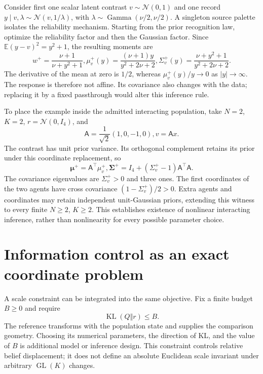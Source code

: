 \documentclass[11pt]{article}
\newcommand{\KL}{\operatorname{KL}}
\newcommand{\E}{\mathbb E}
\newcommand{\GL}{\operatorname{GL}}
\newcommand{\Ga}{\operatorname{Gamma}}
\newcommand{\m}{\boldsymbol{\mu}}
\newcommand{\Sig}{\boldsymbol{\Sigma}}
\begin{document}
Consider first one scalar latent contrast $v\sim\mathcal N(0,1)$ and one record $y\mid v,\lambda\sim\mathcal N(v,1/\lambda)$, with $\lambda\sim\Ga(\nu/2,\nu/2)$. A singleton source palette isolates the reliability mechanism. Starting from the prior recognition law, optimize the reliability factor and then the Gaussian factor. Since $\E(y-v)^2=y^2+1$, the resulting moments are
\begin{equation}
 w^+=\frac{\nu+1}{\nu+y^2+1},
 \mu_v^+(y)=\frac{(\nu+1)y}{y^2+2\nu+2},
 \Sigma_v^+(y)=\frac{\nu+y^2+1}{y^2+2\nu+2}.
\label{eq:scalarresponse}
\end{equation}
The derivative of the mean at zero is $1/2$, whereas $\mu_v^+(y)/y\to0$ as $|y|\to\infty$. The response is therefore not affine. Its covariance also changes with the data; replacing it by a fixed passthrough would alter this inference rule.

To place the example inside the admitted interacting population, take $N=2$, $K=2$, $r=\mathcal N(0,I_4)$, and
\begin{equation}
\mathsf A=\frac1{\sqrt2}(1,0,-1,0), v=\mathsf A x.
\label{eq:contrast}
\end{equation}
The contrast has unit prior variance. Its orthogonal complement retains its prior under this coordinate replacement, so
\begin{equation}
\m^+=\mathsf A^\top\mu_v^+,
\Sig^+=I_4+(\Sigma_v^+-1)\mathsf A^\top\mathsf A.
\label{eq:embedding}
\end{equation}
The covariance eigenvalues are $\Sigma_v^+>0$ and three ones. The first coordinates of the two agents have cross covariance $(1-\Sigma_v^+)/2>0$. Extra agents and coordinates may retain independent unit-Gaussian priors, extending this witness to every finite $N\ge2$, $K\ge2$. This establishes existence of nonlinear interacting inference, rather than nonlinearity for every possible parameter choice.

\section{Information control as an exact coordinate problem}
\label{sec:budget}

A scale constraint can be integrated into the same objective. Fix a finite budget $B\ge0$ and require
\begin{equation}
\KL(Q\Vert r)\le B.
\label{eq:budget}
\end{equation}
The reference transforms with the population state and supplies the comparison geometry. Choosing its numerical parameters, the direction of KL, and the value of $B$ is additional model or inference design. This constraint controls relative belief displacement; it does not define an absolute Euclidean scale invariant under arbitrary $\GL(K)$ changes.
\end{document}
